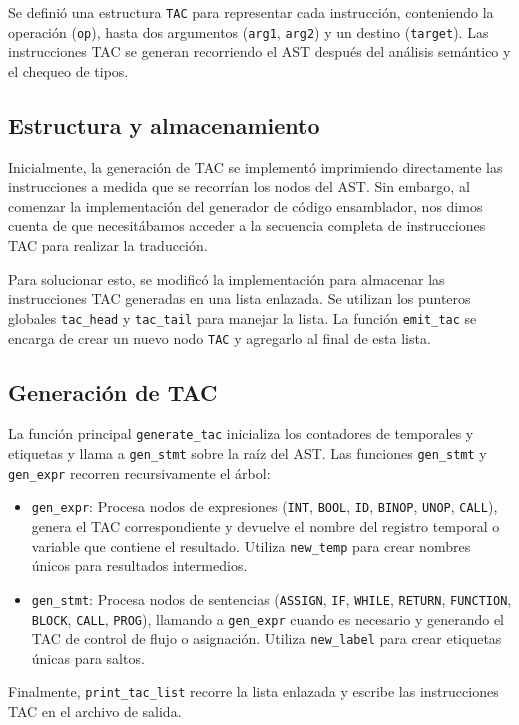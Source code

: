 \documentclass[12pt,a4paper]{article}
\begin{document}
Se definió una estructura \texttt{TAC} para representar cada instrucción, conteniendo la operación (\texttt{op}), hasta dos argumentos (\texttt{arg1}, \texttt{arg2}) y un destino (\texttt{target}). Las instrucciones TAC se generan recorriendo el AST después del análisis semántico y el chequeo de tipos.

\subsection{Estructura y almacenamiento}
Inicialmente, la generación de TAC se implementó imprimiendo directamente las instrucciones a medida que se recorrían los nodos del AST. Sin embargo, al comenzar la implementación del generador de código ensamblador, nos dimos cuenta de que necesitábamos acceder a la secuencia completa de instrucciones TAC para realizar la traducción.

Para solucionar esto, se modificó la implementación para almacenar las instrucciones TAC generadas en una lista enlazada. Se utilizan los punteros globales \texttt{tac\_head} y \texttt{tac\_tail} para manejar la lista. La función \texttt{emit\_tac} se encarga de crear un nuevo nodo \texttt{TAC} y agregarlo al final de esta lista.

\subsection{Generación de TAC}
La función principal \texttt{generate\_tac} inicializa los contadores de temporales y etiquetas y llama a \texttt{gen\_stmt} sobre la raíz del AST. Las funciones \texttt{gen\_stmt} y \texttt{gen\_expr} recorren recursivamente el árbol:
\begin{itemize}
    \item \texttt{gen\_expr}: Procesa nodos de expresiones (\texttt{INT}, \texttt{BOOL}, \texttt{ID}, \texttt{BINOP}, \texttt{UNOP}, \texttt{CALL}), genera el TAC correspondiente y devuelve el nombre del registro temporal o variable que contiene el resultado. Utiliza \texttt{new\_temp} para crear nombres únicos para resultados intermedios.
    \item \texttt{gen\_stmt}: Procesa nodos de sentencias (\texttt{ASSIGN}, \texttt{IF}, \texttt{WHILE}, \texttt{RETURN}, \texttt{FUNCTION}, \texttt{BLOCK}, \texttt{CALL}, \texttt{PROG}), llamando a \texttt{gen\_expr} cuando es necesario y generando el TAC de control de flujo o asignación. Utiliza \texttt{new\_label} para crear etiquetas únicas para saltos.
\end{itemize}
Finalmente, \texttt{print\_tac\_list} recorre la lista enlazada y escribe las instrucciones TAC en el archivo de salida.
\end{document}
